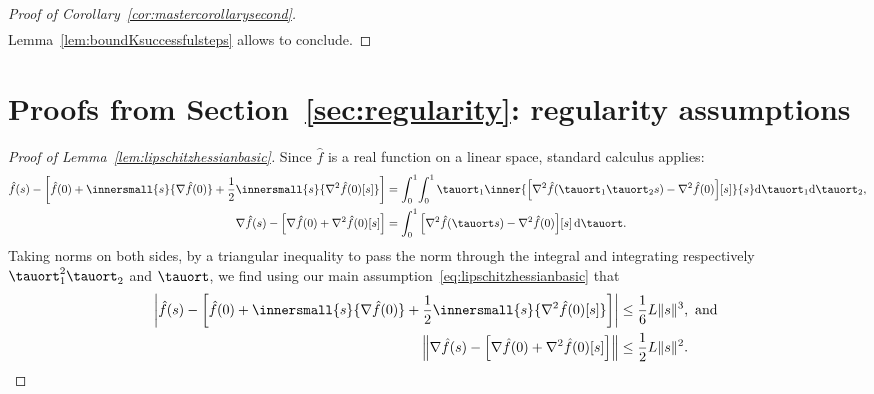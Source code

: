 \begin{proof}[Proof of Corollary~\ref{cor:mastercorollarysecond}]
\begin{align*}
	\end{align*} 
	Lemma~\ref{lem:boundKsuccessfulsteps} allows to conclude. 
\end{proof}


\section{Proofs from Section~\ref{sec:regularity}: regularity assumptions} \label{app:regularity}
\begin{proof}[Proof of Lemma~\ref{lem:lipschitzhessianbasic}]
	Since $\hat f$ is a real function on a linear space, standard calculus applies:
	\begin{align*}
		\hat f(s) - \left[ \hat f(0) + \innersmall{s}{\nabla \hat f(0)} + \frac{1}{2} \innersmall{s}{\nabla^2 \hat f(0)[s]} \right] & = \int_{0}^{1}\!\int_{0}^{1} \tauort_1 \inner{\left[ \nabla^2 \hat f(\tauort_1\tauort_2 s) - \nabla^2 \hat f(0) \right]\![s]}{s}  \mathrm{d}\tauort_1 \mathrm{d}\tauort_2, \\
		\nabla \hat f(s) - \left[\nabla \hat f(0) + \nabla^2 \hat f(0)[s]\right] & = \int_{0}^{1} \left[ \nabla^2 \hat f(\tauort s) - \nabla^2 \hat f(0) \right]\![s] \, \mathrm{d}\tauort.
	\end{align*}
	Taking norms on both sides, by a triangular inequality to pass the norm through the integral and integrating respectively $\tauort_1^2 \tauort_2^{}$ and $\tauort$, we find using our main assumption~\eqref{eq:lipschitzhessianbasic} that
	\begin{align*}
		\left| \hat f(s) - \left[ \hat f(0) + \innersmall{s}{\nabla \hat f(0)} + \frac{1}{2} \innersmall{s}{\nabla^2 \hat f(0)[s]} \right] \right| & \leq \frac{1}{6} L \|s\|^3, \textrm{ and } \\
		\left\| \nabla \hat f(s) - \left[\nabla \hat f(0) + \nabla^2 \hat f(0)[s]\right] \right\| & \leq \frac{1}{2} L \|s\|^2. \qedhere
	\end{align*}
\end{proof}


